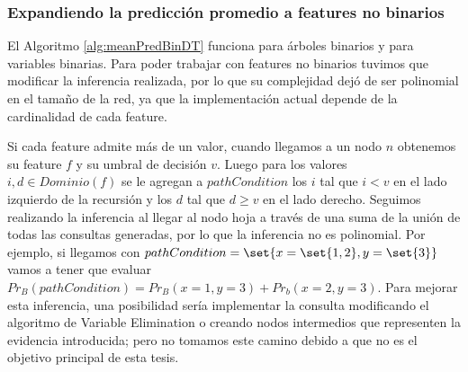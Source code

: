 \subsubsection{Expandiendo la predicción promedio a features no binarios} 


El Algoritmo \ref{alg:meanPredBinDT} funciona para árboles binarios y para variables binarias. Para poder trabajar con features no binarios tuvimos que modificar la inferencia realizada, por lo que su complejidad dejó de ser polinomial en el tamaño de la red, ya que la implementación actual depende de la cardinalidad de cada feature.

Si cada feature admite más de un valor, cuando llegamos a un nodo $n$ obtenemos su feature $f$ y su umbral de decisión $v$. Luego para los valores $i,d \in Dominio(f)$ se le agregan a $pathCondition$ los $i$ tal que $i<v$ en el lado izquierdo de la recursión y los $d$ tal que $d \geq v$ en el lado derecho. Seguimos realizando la inferencia al llegar al nodo hoja a través de una suma de la unión de todas las consultas generadas, por lo que la inferencia no es polinomial. Por ejemplo, si llegamos con $pathCondition = \set{x=\set{1,2},y=\set{3}}$ vamos a tener que evaluar $Pr_B(pathCondition) = Pr_B(x=1,y=3) + Pr_b(x=2,y=3)$. Para mejorar esta inferencia, una posibilidad sería implementar la consulta modificando el algoritmo de Variable Elimination o creando nodos intermedios que representen la evidencia introducida; pero no tomamos este camino debido a que no es el objetivo principal de esta tesis. 



